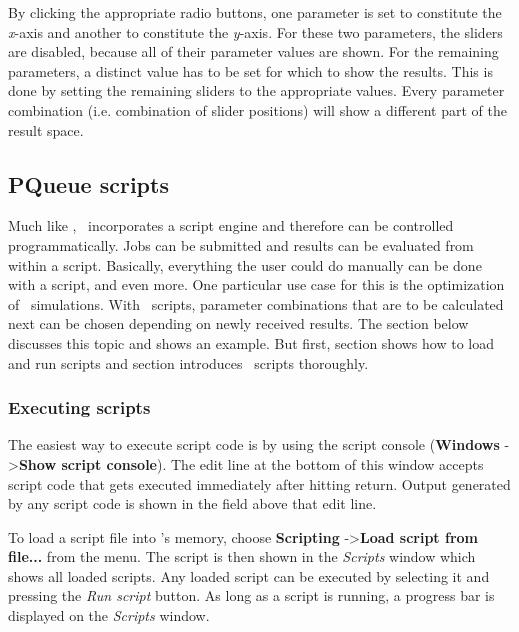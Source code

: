 By clicking the appropriate radio buttons,
one parameter is set to constitute the \textit{x}-axis and another to constitute the \textit{y}-axis.
For these two parameters, the sliders are disabled, because all of their parameter values are shown.
For the remaining parameters, a distinct value has to be set for which to show the results.
This is done by setting the remaining sliders to the appropriate values.
Every parameter combination (i.e. combination of slider positions) will show a different part of the result space.





\subsection{PQueue scripts}
Much like \PHO, \PQUEUE\ incorporates a script engine and therefore can be controlled programmatically.
Jobs can be submitted and results can be evaluated from within a script.
Basically, everything the user could do manually can be done with a script, and even more.
One particular use case for this is the optimization of \PHO\ simulations.
With \PQUEUE\ scripts, parameter combinations that are to be calculated next
can be chosen depending on newly received results.
The section \textit{} below discusses this topic and shows an example.
But first, section \textit{} shows how to load and run scripts
and section \textit{} introduces \PQUEUE\ scripts thoroughly.

\subsubsection{Executing scripts}
\label{pqueue:scripts:executing}
The easiest way to execute script code is by using the script console (\textbf{Windows} -\textgreater \textbf{Show script console}).
The edit line at the bottom of this window accepts script code that gets executed immediately after hitting return.
Output generated by any script code is shown in the field above that edit line.\bb

To load a script file into \PQUEUE's memory, choose \textbf{Scripting} -\textgreater \textbf{Load script from file...} from the menu.
The script is then shown in the \textit{Scripts} window which shows all loaded scripts.
Any loaded script can be executed by selecting it and pressing the \textit{Run script} button.
As long as a script is running, a progress bar is displayed on the \textit{Scripts} window.\bb

